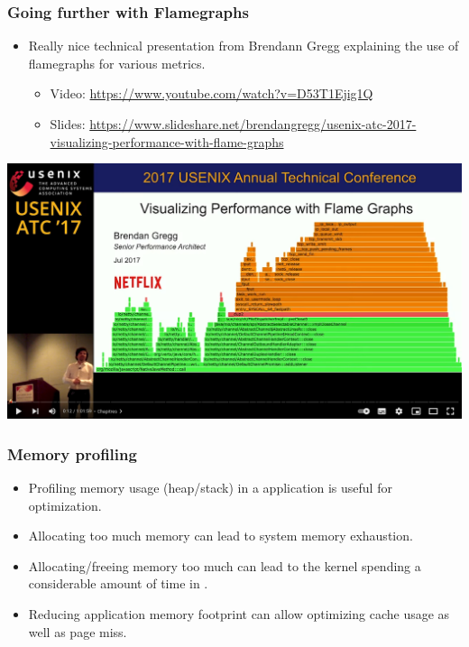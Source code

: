 \begin{frame}[fragile]
  \frametitle{Going further with Flamegraphs}
  \begin{itemize}
    \item Really nice technical presentation from Brendann Gregg explaining
          the use of flamegraphs for various metrics.
    \begin{itemize}
      \item Video: \url{https://www.youtube.com/watch?v=D53T1Ejig1Q}
      \item Slides: \url{https://www.slideshare.net/brendangregg/usenix-atc-2017-visualizing-performance-with-flame-graphs}
    \end{itemize}
  \end{itemize}
  \begin{center}
  \center\includegraphics[height=0.5\textheight]{slides/debugging-application-profiling/flamegraph_atc20.png}
  \end{center}
\end{frame}

\begin{frame}
  \frametitle{Memory profiling}
  \begin{itemize}
    \item Profiling memory usage (heap/stack) in a application is useful for
          optimization.
    \item Allocating too much memory can lead to system memory exhaustion.
    \item Allocating/freeing memory too much can lead to the kernel spending a
          considerable amount of time in .
    \item Reducing application memory footprint can allow optimizing cache usage
          as well as page miss.
  \end{itemize}
\end{frame}

